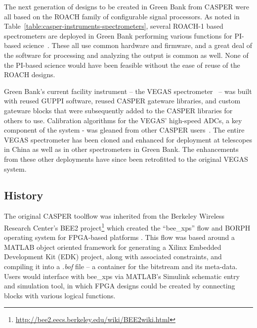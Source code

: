 \documentclass{ws-jai}
\begin{document}
The next generation of designs to be created in Green Bank from CASPER
were all based on the ROACH family of configurable signal processors.
As noted in Table~\ref{table:casper-instruments-spectrometers}, several ROACH-1 based spectrometers
are deployed in Green Bank performing various functions for PI-based
science~\citep[for example]{skynet}.  These all use common
hardware and firmware, and a great deal of the software for processing
and analyzing the output is common as well.  None of the PI-based
science would have been feasible without the ease of reuse of the
ROACH designs.

Green Bank's current facility instrument -- the VEGAS
spectrometer~\citep{chennamangalam2014gpu} -- was built with reused GUPPI
software, reused CASPER gateware libraries, and custom gateware
blocks that were subsequently added to the CASPER libraries for others
to use.  Calibration algorithms for the VEGAS' high-speed ADCs, a key component of the system - was gleaned from other
CASPER users~\citep{adc5g}.
The entire VEGAS spectrometer has been cloned and enhanced for
deployment at telescopes in China as well
as in other spectrometers in Green Bank.  The enhancements from these
other deployments have since been retrofitted to the original VEGAS system.

%
%

\subsection{History}
The original CASPER toolflow was inherited from the Berkeley Wireless Research Center's BEE2 project\footnote{\url{http://bee2.eecs.berkeley.edu/wiki/BEE2wiki.html}} which created the ``bee\_xps'' flow and BORPH operating system for FPGA-based platforms \citep{borph1, borph2, borph-thesis}. This flow was based around a MATLAB object oriented framework for generating a Xilinx Embedded Development Kit (EDK) project, along with associated constraints, and compiling it into a \emph{.bof} file -- a container for the bitstream and its meta-data. Users would interface with bee\_xps via MATLAB's Simulink schematic entry and simulation tool, in which FPGA designs could be created by connecting blocks with various logical functions.
\end{document}

